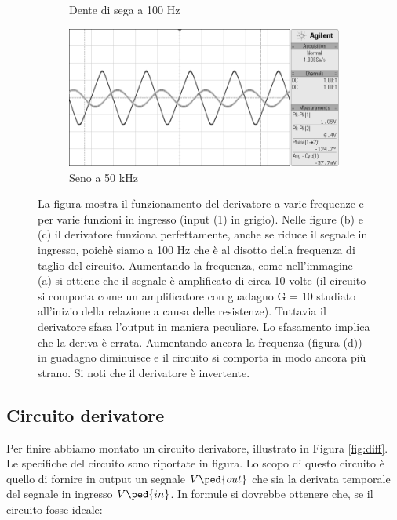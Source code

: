\begin{figure}[b!]
\begin{subfigure}[t]{0.49\textwidth}
        \caption{Dente di sega a 100 Hz}
        \label{fig:b3}
    \end{subfigure}
    \begin{subfigure}[t]{0.49\textwidth}
        \includegraphics[width=\textwidth]{s16.png}
        \caption{Seno a 50 kHz}
        \label{fig:b4}
    \end{subfigure}
    \caption{La figura mostra il funzionamento del derivatore a varie frequenze e per varie funzioni in ingresso
        (input (1) in grigio).
        Nelle figure (b) e (c) il derivatore funziona perfettamente, anche se riduce il segnale in ingresso, poichè
        siamo a 100 Hz che è al disotto della frequenza di taglio del circuito. Aumentando la frequenza, come nell'immagine
        (a) si ottiene che il segnale è amplificato di circa 10 volte (il circuito si comporta come un
        amplificatore con guadagno G = 10 studiato all'inizio della relazione a causa delle resistenze). Tuttavia
        il derivatore sfasa l'output in maniera peculiare. Lo sfasamento implica che la deriva è errata. Aumentando ancora
        la frequenza (figura (d)) in guadagno diminuisce e il circuito si comporta in modo ancora più strano. Si noti che
        il derivatore è invertente.}
    \label{fig:scope}
\end{figure}

\subsection*{Circuito derivatore}

Per finire abbiamo montato un circuito derivatore, illustrato in Figura \ref{fig:diff}.
Le specifiche del circuito sono riportate in figura.
Lo scopo di questo circuito è quello di fornire in output un segnale $V\ped{out}$
che sia la derivata temporale del segnale in ingresso $V\ped{in}$. In formule si dovrebbe ottenere
che, se il circuito fosse ideale:

